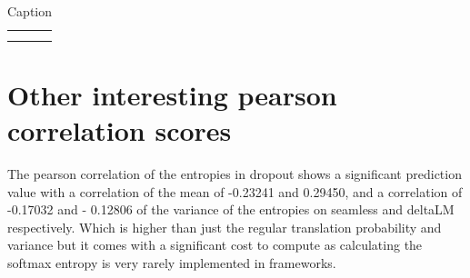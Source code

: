 \begin{table}[]
    \centering
    \begin{tabular}{c|c}
         &  \\
         & 
    \end{tabular}
    \caption{Caption}
    \label{seamlesse2enonesense}
\end{table}
    

\section{Other interesting pearson correlation scores}
The pearson correlation of the entropies in dropout shows a significant prediction value with a correlation of the mean of -0.23241 and 0.29450, and a correlation of -0.17032 and - 0.12806 of the variance of the entropies on seamless and deltaLM respectively. Which is higher than just the regular translation probability and variance but it comes with a significant cost to compute as calculating the softmax entropy is very rarely implemented in frameworks.
